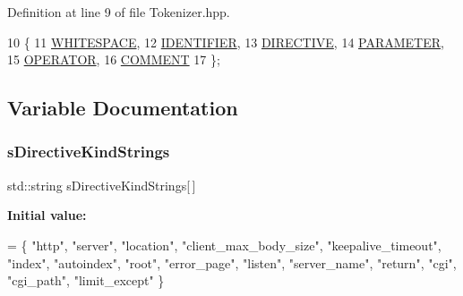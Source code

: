 Definition at line 9 of file Tokenizer.\+hpp.


\begin{DoxyCode}
10     \{
11         \hyperlink{namespaceft_aa520fbf142ba1e7e659590c07da31921aba113c37f25d24aada154b75c7dd91ba}{WHITESPACE},
12         \hyperlink{namespaceft_aa520fbf142ba1e7e659590c07da31921a84f8ae2490f9e4bd2321fd21f4b0e807}{IDENTIFIER},
13         \hyperlink{namespaceft_aa520fbf142ba1e7e659590c07da31921ae3852cb010d5e422026faf83b3c16f0e}{DIRECTIVE},
14         \hyperlink{namespaceft_aa520fbf142ba1e7e659590c07da31921a194cde856bd2d79eac8adb9741c55940}{PARAMETER},
15         \hyperlink{namespaceft_aa520fbf142ba1e7e659590c07da31921a6411d9d6073252e4d316493506bbb979}{OPERATOR},
16         \hyperlink{namespaceft_aa520fbf142ba1e7e659590c07da31921aae696377c19e507b64e16be78ce3bbdb}{COMMENT}
17     \};
\end{DoxyCode}


\subsection{Variable Documentation}
\mbox{\label{namespaceft_a2896a632198d516af93e4aea2d125f59}} 
\subsubsection{\texorpdfstring{s\+Directive\+Kind\+Strings}{sDirectiveKindStrings}}
{\footnotesize\ttfamily std\+::string s\+Directive\+Kind\+Strings\mbox{[}$\,$\mbox{]}\hspace{0.3cm}{\ttfamily [static]}}

{\bfseries Initial value\+:}
\begin{DoxyCode}
= \{
        \textcolor{stringliteral}{"http"},
        \textcolor{stringliteral}{"server"},
        \textcolor{stringliteral}{"location"},
        \textcolor{stringliteral}{"client\_max\_body\_size"},
        \textcolor{stringliteral}{"keepalive\_timeout"},
        \textcolor{stringliteral}{"index"},
        \textcolor{stringliteral}{"autoindex"},
        \textcolor{stringliteral}{"root"},
        \textcolor{stringliteral}{"error\_page"},
        \textcolor{stringliteral}{"listen"},
        \textcolor{stringliteral}{"server\_name"},
        \textcolor{stringliteral}{"return"},
        \textcolor{stringliteral}{"cgi"},
        \textcolor{stringliteral}{"cgi\_path"},
        \textcolor{stringliteral}{"limit\_except"}
    \}
\end{DoxyCode}


